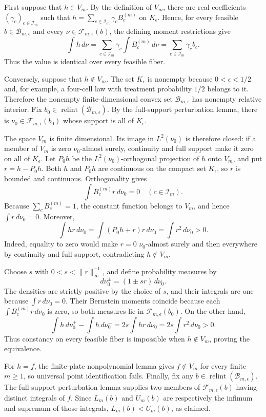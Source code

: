First suppose that \(h\in V_m\).  By the definition of \(V_m\), there are real coefficients \((\gamma_c)_{c\in\mathcal I_m}\) such that \(h=\sum_{c\in\mathcal I_m}\gamma_cB_c^{(m)}\) on \(K_{\epsilon}\).  Hence, for every feasible \(b\in\mathcal B_{m,\epsilon}\) and every \(\nu\in\mathcal F_{m,\epsilon}(b)\), the defining moment restrictions give
\[
 \int h\,d\nu
 =\sum_{c\in\mathcal I_m}\gamma_c\int B_c^{(m)}\,d\nu
 =\sum_{c\in\mathcal I_m}\gamma_cb_c.
\]
Thus the value is identical over every feasible fiber.

Conversely, suppose that \(h\notin V_m\).  The set \(K_{\epsilon}\) is nonempty because \(0<\epsilon<1/2\) and, for example, a four-cell law with treatment probability \(1/2\) belongs to it.  Therefore the nonempty finite-dimensional convex set \(\mathcal B_{m,\epsilon}\) has nonempty relative interior.  Fix \(b_0\in\operatorname{relint}(\mathcal B_{m,\epsilon})\).  By the full-support perturbation lemma, there is \(\nu_0\in\mathcal F_{m,\epsilon}(b_0)\) whose support is all of \(K_{\epsilon}\).

The space \(V_m\) is finite dimensional.  Its image in \(L^2(\nu_0)\) is therefore closed: if a member of \(V_m\) is zero \(\nu_0\)-almost surely, continuity and full support make it zero on all of \(K_{\epsilon}\).  Let \(P_0h\) be the \(L^2(\nu_0)\)-orthogonal projection of \(h\) onto \(V_m\), and put \(r=h-P_0h\).  Both \(h\) and \(P_0h\) are continuous on the compact set \(K_{\epsilon}\), so \(r\) is bounded and continuous.  Orthogonality gives
\[
 \int B_c^{(m)}r\,d\nu_0=0\quad(c\in\mathcal I_m).
\]
Because \(\sum_cB_c^{(m)}=1\), the constant function belongs to \(V_m\), and hence \(\int r\,d\nu_0=0\).  Moreover,
\[
 \int hr\,d\nu_0
 =\int (P_0h+r)r\,d\nu_0
 =\int r^2\,d\nu_0>0.
\]
Indeed, equality to zero would make \(r=0\) \(\nu_0\)-almost surely and then everywhere by continuity and full support, contradicting \(h\notin V_m\).

Choose \(s\) with \(0<s<\|r\|_{\infty}^{-1}\), and define probability measures by
\[
 d\nu_0^{\pm}=(1\pm sr)\,d\nu_0.
\]
The densities are strictly positive by the choice of \(s\), and their integrals are one because \(\int r\,d\nu_0=0\).  Their Bernstein moments coincide because each \(\int B_c^{(m)}r\,d\nu_0\) is zero, so both measures lie in \(\mathcal F_{m,\epsilon}(b_0)\).  On the other hand,
\[
 \int h\,d\nu_0^+-\int h\,d\nu_0^-
 =2s\int hr\,d\nu_0
 =2s\int r^2\,d\nu_0>0.
\]
Thus constancy on every feasible fiber is impossible when \(h\notin V_m\), proving the equivalence.

For \(h=f\), the finite-plate nonpolynomial lemma gives \(f\notin V_m\) for every finite \(m\ge1\), so universal point identification fails.  Finally, fix any \(b\in\operatorname{relint}(\mathcal B_{m,\epsilon})\).  The full-support perturbation lemma supplies two members of \(\mathcal F_{m,\epsilon}(b)\) having distinct integrals of \(f\).  Since \(L_m(b)\) and \(U_m(b)\) are respectively the infimum and supremum of those integrals, \(L_m(b)<U_m(b)\), as claimed.